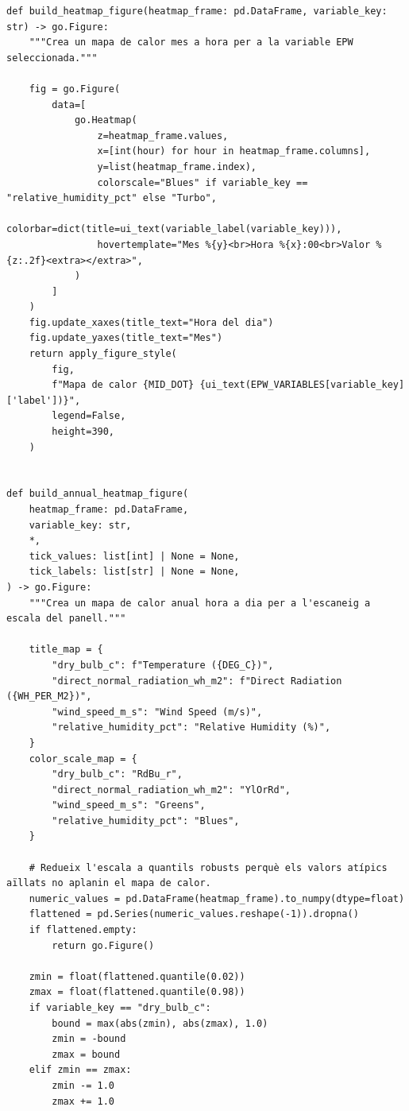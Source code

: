 \documentclass[10pt,a4paper]{article}
\begin{document}
\begin{lstlisting}[style=studioPython,caption={backend/epw\_figures.py},label={lst:backend-epw-figures-py}]
def build_heatmap_figure(heatmap_frame: pd.DataFrame, variable_key: str) -> go.Figure:
    """Crea un mapa de calor mes a hora per a la variable EPW seleccionada."""

    fig = go.Figure(
        data=[
            go.Heatmap(
                z=heatmap_frame.values,
                x=[int(hour) for hour in heatmap_frame.columns],
                y=list(heatmap_frame.index),
                colorscale="Blues" if variable_key == "relative_humidity_pct" else "Turbo",
                colorbar=dict(title=ui_text(variable_label(variable_key))),
                hovertemplate="Mes %{y}<br>Hora %{x}:00<br>Valor %{z:.2f}<extra></extra>",
            )
        ]
    )
    fig.update_xaxes(title_text="Hora del dia")
    fig.update_yaxes(title_text="Mes")
    return apply_figure_style(
        fig,
        f"Mapa de calor {MID_DOT} {ui_text(EPW_VARIABLES[variable_key]['label'])}",
        legend=False,
        height=390,
    )


def build_annual_heatmap_figure(
    heatmap_frame: pd.DataFrame,
    variable_key: str,
    *,
    tick_values: list[int] | None = None,
    tick_labels: list[str] | None = None,
) -> go.Figure:
    """Crea un mapa de calor anual hora a dia per a l'escaneig a escala del panell."""

    title_map = {
        "dry_bulb_c": f"Temperature ({DEG_C})",
        "direct_normal_radiation_wh_m2": f"Direct Radiation ({WH_PER_M2})",
        "wind_speed_m_s": "Wind Speed (m/s)",
        "relative_humidity_pct": "Relative Humidity (%)",
    }
    color_scale_map = {
        "dry_bulb_c": "RdBu_r",
        "direct_normal_radiation_wh_m2": "YlOrRd",
        "wind_speed_m_s": "Greens",
        "relative_humidity_pct": "Blues",
    }

    # Redueix l'escala a quantils robusts perquè els valors atípics aïllats no aplanin el mapa de calor.
    numeric_values = pd.DataFrame(heatmap_frame).to_numpy(dtype=float)
    flattened = pd.Series(numeric_values.reshape(-1)).dropna()
    if flattened.empty:
        return go.Figure()

    zmin = float(flattened.quantile(0.02))
    zmax = float(flattened.quantile(0.98))
    if variable_key == "dry_bulb_c":
        bound = max(abs(zmin), abs(zmax), 1.0)
        zmin = -bound
        zmax = bound
    elif zmin == zmax:
        zmin -= 1.0
        zmax += 1.0


\end{lstlisting}
\end{document}
